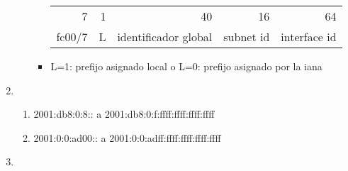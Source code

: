\documentclass[11pt]{article}
\begin{document}
\begin{enumerate}
\begin{itemize}
\begin{itemize}
\begin{center}
\begin{tabular}{rrrrr}
7 & 1 & 40 & 16 & 64\\
fc00/7 & L & identificador global & subnet id & interface id\\
\end{tabular}
\end{center}
\item L=1: prefijo asignado local o L=0: prefijo asignado por la iana
\end{itemize}
\end{itemize}
\item \begin{enumerate}
\item 2001:db8:0:8:: a 2001:db8:0:f:ffff:ffff:ffff:ffff
\item 2001:0:0:ad00:: a 2001:0:0:adff:ffff:ffff:ffff:ffff
\end{enumerate}
\item 
\end{enumerate}
\end{document}

